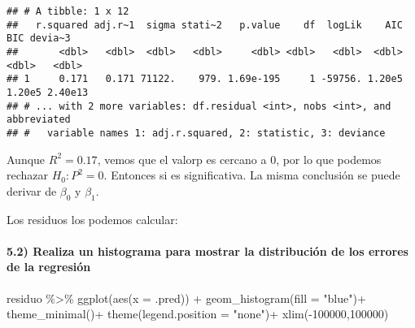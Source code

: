 \documentclass[
]{article}
\newenvironment{Shaded}{\begin{snugshade}}{\end{snugshade}}
\newcommand{\AttributeTok}[1]{\textcolor[rgb]{0.77,0.63,0.00}{#1}}
\newcommand{\DecValTok}[1]{\textcolor[rgb]{0.00,0.00,0.81}{#1}}
\newcommand{\FunctionTok}[1]{\textcolor[rgb]{0.00,0.00,0.00}{#1}}
\newcommand{\NormalTok}[1]{#1}
\newcommand{\OtherTok}[1]{\textcolor[rgb]{0.56,0.35,0.01}{#1}}
\newcommand{\SpecialCharTok}[1]{\textcolor[rgb]{0.00,0.00,0.00}{#1}}
\newcommand{\StringTok}[1]{\textcolor[rgb]{0.31,0.60,0.02}{#1}}
\begin{document}
\begin{verbatim}
## # A tibble: 1 x 12
##   r.squared adj.r~1  sigma stati~2   p.value    df  logLik    AIC    BIC devia~3
##       <dbl>   <dbl>  <dbl>   <dbl>     <dbl> <dbl>   <dbl>  <dbl>  <dbl>   <dbl>
## 1     0.171   0.171 71122.    979. 1.69e-195     1 -59756. 1.20e5 1.20e5 2.40e13
## # ... with 2 more variables: df.residual <int>, nobs <int>, and abbreviated
## #   variable names 1: adj.r.squared, 2: statistic, 3: deviance
\end{verbatim}

Aunque \(R^2 = 0.17\), vemos que el valorp es cercano a 0, por lo que
podemos rechazar \(H_0: P^2= 0\). Entonces si es significativa. La misma
conclusión se puede derivar de \(\beta_0\) y \(\beta_1\).

Los residuos los podemos calcular:

\begin{Shaded}
\end{Shaded}

\hypertarget{realiza-un-histograma-para-mostrar-la-distribuciuxf3n-de-los-errores-de-la-regresiuxf3n}{%
\paragraph{5.2) Realiza un histograma para mostrar la distribución de
los errores de la
regresión}\label{realiza-un-histograma-para-mostrar-la-distribuciuxf3n-de-los-errores-de-la-regresiuxf3n}}

\begin{Shaded}
\begin{Highlighting}[]
\NormalTok{residuo }\SpecialCharTok{\%\textgreater{}\%} 
  \FunctionTok{ggplot}\NormalTok{(}\FunctionTok{aes}\NormalTok{(}\AttributeTok{x =}\NormalTok{ .pred)) }\SpecialCharTok{+}
  \FunctionTok{geom\_histogram}\NormalTok{(}\AttributeTok{fill =} \StringTok{"blue"}\NormalTok{)}\SpecialCharTok{+}
  \FunctionTok{theme\_minimal}\NormalTok{()}\SpecialCharTok{+}
  \FunctionTok{theme}\NormalTok{(}\AttributeTok{legend.position =} \StringTok{"none"}\NormalTok{)}\SpecialCharTok{+}
  \FunctionTok{xlim}\NormalTok{(}\SpecialCharTok{{-}}\DecValTok{100000}\NormalTok{,}\DecValTok{100000}\NormalTok{)}
\end{Highlighting}
\end{Shaded}
\end{document}
